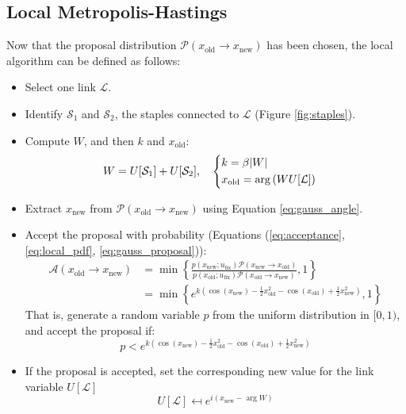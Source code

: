 \subsection*{Local Metropolis-Hastings}
Now that the proposal distribution $\mathcal P(x_\mathrm{old}\to x_\mathrm{new})$ has been chosen,
the local algorithm can be defined as follows:
\begin{itemize}
    \item Select one link $\mathcal L$.
    \item Identify $\mathcal S_1$ and $\mathcal S_2$, the staples connected to $\mathcal L$ (Figure \ref{fig:staples}).
    \item Compute $W$, and then $k$ and $x_\mathrm{old}$:
        \[\begin{aligned}
            &W = U[\mathcal S_1] + U[\mathcal S_2],
            &
            &\begin{dcases}
                k = \beta |W| \\
                x_\mathrm{old} = \arg\left(WU[\mathcal L]\right)
            \end{dcases}
        \end{aligned}\]
    \item Extract $x_\mathrm{new}$ from $\mathcal P(x_\mathrm{old}\to x_\mathrm{new})$ using Equation \eqref{eq:gauss_angle}.
    \item Accept the proposal with probability (Equations (\ref{eq:acceptance}, \ref{eq:local_pdf}, \ref{eq:gauss_proposal})):
        \[\begin{aligned}
            \mathcal A(x_\mathrm{old}\to x_\mathrm{new})
                 &=  \min\left\{\frac{p(x_\mathrm{new};u_\mathrm{fix})\mathcal P(x_\mathrm{new}\to x_\mathrm{old})}
                                     {p(x_\mathrm{old};u_\mathrm{fix})\mathcal P(x_\mathrm{old}\to x_\mathrm{new})},1\right\} \\[.5em]
                 &= \min\left\{e^{k\left(\cos(x_\mathrm{new})-\frac{1}{2}x_\mathrm{old}^2-\cos(x_\mathrm{old})+\frac{1}{2}x_\mathrm{new}^2\right)},1\right\}
        \end{aligned}\]
        That is, generate a random variable $p$ from the uniform distribution in $[0,1)$,
        and accept the proposal if:
        \[
            p < e^{k\left(\cos(x_\mathrm{new})-\frac{1}{2}x_\mathrm{old}^2-\cos(x_\mathrm{old})+\frac{1}{2}x_\mathrm{new}^2\right)}
        \]
    \item If the proposal is accepted, set the corresponding new value for the link variable $U[\mathcal L]$
        \[
            U[\mathcal L] \mapsfrom e^{i(x_\mathrm{new}-\arg W)}
        \]
\end{itemize}

